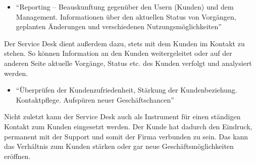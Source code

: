 \begin{itemize}
\item \enquote{Reporting – Beauskunftung gegenüber den Usern (Kunden)
und dem Management. Informationen über den aktuellen
Status von Vorgängen, geplanten Änderungen und
verschiedenen Nutzungsmöglichkeiten}
\end{itemize}
\noindent
Der Service Desk dient außerdem dazu, stets mit dem Kunden im Kontakt zu stehen. So können Information an den Kunden weitergeleitet oder auf der anderen Seite aktuelle Vorgänge, Status etc. des Kunden verfolgt und analysiert werden. 

\begin{itemize}
\item \enquote{Überprüfen der Kundenzufriedenheit, Stärkung der Kundenbeziehung.
Kontaktpflege. Aufspüren neuer Geschäftschancen}
\end{itemize}
\noindent
Nicht zuletzt kann der Service Desk auch als Instrument für einen ständigen Kontakt zum Kunden eingesetzt werden. Der Kunde hat dadurch den Eindruck, permanent mit der Support und somit der Firma verbunden zu sein. Das kann das Verhältnis zum Kunden stärken oder gar neue Geschäftsmöglichkeiten eröffnen.\\








   


 
